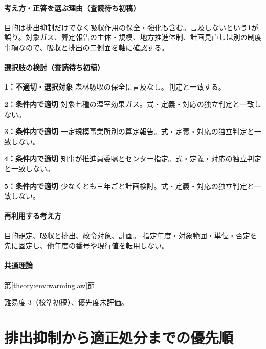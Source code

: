 \paragraph{考え方・正答を選ぶ理由（査読待ち初稿）} 目的は排出抑制だけでなく吸収作用の保全・強化も含む。言及しないという1が誤り。対象ガス、算定報告の主体・規模、地方推進体制、計画見直しは別の制度事項なので、吸収と排出の二側面を軸に確認する。

\paragraph{選択肢の検討（査読待ち初稿）}\mbox{}\par

\noindent\textbf{1：不適切・選択対象} 森林吸収の保全に言及なし。判定と一致する。\par

\noindent\textbf{2：条件内で適切} 対象七種の温室効果ガス。式・定義・対応の独立判定と一致しない。\par

\noindent\textbf{3：条件内で適切} 一定規模事業所別の算定報告。式・定義・対応の独立判定と一致しない。\par

\noindent\textbf{4：条件内で適切} 知事が推進員委嘱とセンター指定。式・定義・対応の独立判定と一致しない。\par

\noindent\textbf{5：条件内で適切} 少なくとも三年ごと計画検討。式・定義・対応の独立判定と一致しない。\par

\paragraph{再利用する考え方} 目的規定、吸収と排出、政令対象、計画。 指定年度・対象範囲・単位・否定を先に固定し、他年度の番号や現行値を転用しない。

\paragraph{共通理論} \hyperref[theory:env:warminglaw]{第\ref*{theory:env:warminglaw}節}

\par 難易度 3（校準初稿）、優先度未評価。

\section{排出抑制から適正処分までの優先順}

